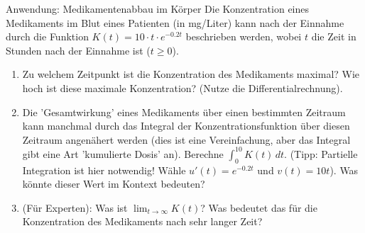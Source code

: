 \begin{aufgabenumgebung}{Anwendung: Medikamentenabbau im Körper}
Die Konzentration eines Medikaments im Blut eines Patienten (in mg/Liter) kann nach der Einnahme durch die Funktion $K(t) = 10 \cdot t \cdot e^{-0.2t}$ beschrieben werden, wobei $t$ die Zeit in Stunden nach der Einnahme ist ($t \ge 0$).
\begin{enumerate}
    \item Zu welchem Zeitpunkt ist die Konzentration des Medikaments maximal? Wie hoch ist diese maximale Konzentration? (Nutze die Differentialrechnung).
    \item Die 'Gesamtwirkung' eines Medikaments über einen bestimmten Zeitraum kann manchmal durch das Integral der Konzentrationsfunktion über diesen Zeitraum angenähert werden (dies ist eine Vereinfachung, aber das Integral gibt eine Art 'kumulierte Dosis' an).
        Berechne $\int_0^{10} K(t) \,dt$. (Tipp: Partielle Integration ist hier notwendig! Wähle $u'(t)=e^{-0.2t}$ und $v(t)=10t$).
        Was könnte dieser Wert im Kontext bedeuten?
    \item (Für Experten): Was ist $\lim_{t \to \infty} K(t)$? Was bedeutet das für die Konzentration des Medikaments nach sehr langer Zeit?
\end{enumerate}
\end{aufgabenumgebung}


